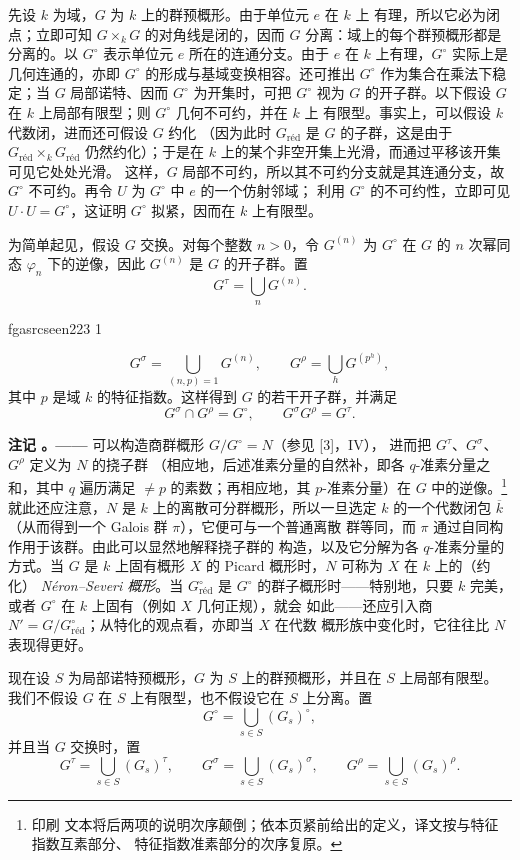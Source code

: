 \documentclass[12pt,twoside,openany]{book}
\numberwithin{equation}{section}
\newcommand{\fgaunitid}{unbound}
\newcommand{\src}[1]{%
  \phantomsection
  \hypertarget{src:\fgaunitid:#1}{}%
  \hypertarget{fga.\fgaunitid.p#1}{}%
  \ifcsname fgasrcseen#1\endcsname\else
    \expandafter\gdef\csname fgasrcseen#1\endcsname{1}%
    \hypertarget{src:#1}{}%
  \fi
  \marginpar{\raggedleft\footnotesize\sffamily #1}%
}
\theoremstyle{plain}
\theoremstyle{definition}
\theoremstyle{remark}
\newcommand{\result}[2]{%
  \par\medskip\noindent\textbf{#1%
  \if\relax\detokenize{#2}\relax\else\space#2\fi。——}\enspace
}
\begin{document}
先设 $k$ 为域，$G$ 为 $k$ 上的群预概形。由于单位元 $e$ 在 $k$ 上
有理，所以它必为闭点；立即可知 $G\times_kG$ 的对角线是闭的，因而
$G$ 分离：域上的每个群预概形都是分离的。以 $G^\circ$ 表示单位元
$e$ 所在的连通分支。由于 $e$ 在 $k$ 上有理，$G^\circ$ 实际上是
几何连通的，亦即 $G^\circ$ 的形成与基域变换相容。还可推出
$G^\circ$ 作为集合在乘法下稳定；当 $G$ 局部诺特、因而
$G^\circ$ 为开集时，可把 $G^\circ$ 视为 $G$ 的开子群。以下假设
$G$ 在 $k$ 上局部有限型；则 $G^\circ$ 几何不可约，并在 $k$ 上
有限型。事实上，可以假设 $k$ 代数闭，进而还可假设 $G$ 约化
（因为此时 $G_{\mathrm{réd}}$ 是 $G$ 的子群，这是由于
$G_{\mathrm{réd}}\times_kG_{\mathrm{réd}}$ 仍然约化）；于是在 $k$
上的某个非空开集上光滑，而通过平移该开集可见它处处光滑。
这样，$G$ 局部不可约，所以其不可约分支就是其连通分支，故
$G^\circ$ 不可约。再令 $U$ 为 $G^\circ$ 中 $e$ 的一个仿射邻域；
利用 $G^\circ$ 的不可约性，立即可见
$U\cdot U=G^\circ$，这证明 $G^\circ$ 拟紧，因而在 $k$ 上有限型。

为简单起见，假设 $G$ 交换。对每个整数 $n>0$，令 $G^{(n)}$ 为
$G^\circ$ 在 $G$ 的 $n$ 次幂同态 $\varphi_n$ 下的逆像，因此
$G^{(n)}$ 是 $G$ 的开子群。置
\[
G^\tau=\bigcup_nG^{(n)}.
\]

\src{223}
\[
G^\sigma=\bigcup_{(n,p)=1}G^{(n)},
\qquad
G^\rho=\bigcup_hG^{(p^h)},
\]
其中 $p$ 是域 $k$ 的特征指数。这样得到 $G$ 的若干开子群，并满足
\[
G^\sigma\cap G^\rho=G^\circ,
\qquad
G^\sigma G^\rho=G^\tau.
\]

\result{注记}{} 可以构造商群概形 $G/G^\circ=N$（参见 [3]，IV），
进而把 $G^\tau$、$G^\sigma$、$G^\rho$ 定义为 $N$ 的挠子群
（相应地，后述准素分量的自然补，即各 $q$-准素分量之和，其中 $q$
遍历满足 $\neq p$ 的素数；再相应地，其 $p$-准素分量）在 $G$ 中的逆像。\footnote{印刷
文本将后两项的说明次序颠倒；依本页紧前给出的定义，译文按与特征指数互素部分、
特征指数准素部分的次序复原。}就此还应注意，$N$
是 $k$ 上的离散可分群概形，所以一旦选定 $k$ 的一个代数闭包
$\overline k$（从而得到一个 Galois 群 $\pi$），它便可与一个普通离散
群等同，而 $\pi$ 通过自同构作用于该群。由此可以显然地解释挠子群的
构造，以及它分解为各 $q$-准素分量的方式。当 $G$ 是 $k$ 上固有概形
$X$ 的 Picard 概形时，$N$ 可称为 $X$ 在 $k$ 上的（约化）
\emph{Néron--Severi 概形}。当
$G^\circ_{\mathrm{réd}}$ 是 $G^\circ$ 的群子概形时——特别地，只要
$k$ 完美，或者 $G^\circ$ 在 $k$ 上固有（例如 $X$ 几何正规），就会
如此——还应引入商
$N'=G/G^\circ_{\mathrm{réd}}$；从特化的观点看，亦即当 $X$ 在代数
概形族中变化时，它往往比 $N$ 表现得更好。

现在设 $S$ 为局部诺特预概形，$G$ 为 $S$ 上的群预概形，并且在 $S$ 上局部有限型。
我们不假设 $G$ 在 $S$ 上有限型，也不假设它在 $S$ 上分离。置
\[
G^\circ=\bigcup_{s\in S}(G_s)^\circ,
\]
并且当 $G$ 交换时，置
\[
G^\tau=\bigcup_{s\in S}(G_s)^\tau,
\qquad
G^\sigma=\bigcup_{s\in S}(G_s)^\sigma,
\qquad
G^\rho=\bigcup_{s\in S}(G_s)^\rho.
\]
\end{document}
